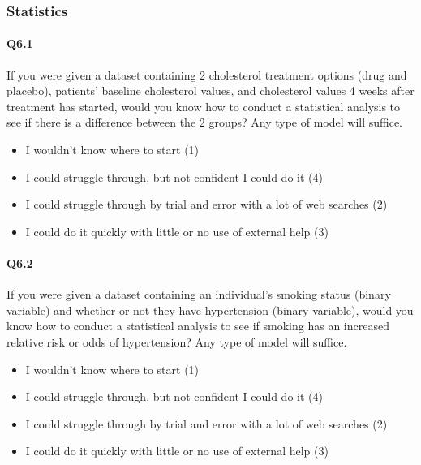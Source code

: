 \documentclass[020-persona\_validation.tex]{subfiles}
\begin{document}
    \subsubsection{Statistics}

        \paragraph{Q6.1}

            If you were given a dataset containing 2 cholesterol treatment options (drug and placebo),
            patients' baseline cholesterol values, and
            cholesterol values 4 weeks after treatment has started,
            would you know how to conduct a statistical analysis to see if there is a difference between the 2 groups?
            Any type of model will suffice.

            \begin{itemize}
                \item I wouldn't know where to start  (1)
                \item I could struggle through, but not confident I could do it  (4)
                \item I could struggle through by trial and error with a lot of web searches  (2)
                \item I could do it quickly with little or no use of external help  (3)
            \end{itemize}

        \paragraph{Q6.2}

            If you were given a dataset containing an individual's smoking status
            (binary variable) and whether or not they have hypertension (binary variable),
            would you know how to conduct a statistical analysis to see
            if smoking has an increased relative risk or odds of hypertension? Any
            type of model will suffice.

            \begin{itemize}
                \item I wouldn't know where to start  (1)
                \item I could struggle through, but not confident I could do it  (4)
                \item I could struggle through by trial and error with a lot of web searches  (2)
                \item I could do it quickly with little or no use of external help  (3)
            \end{itemize}
\end{document}
